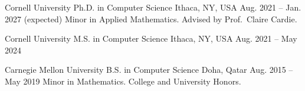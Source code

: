 
\begin{cventries}\acvinlinetrue %
  \cventry
    {Cornell University}
    {Ph.D. in Computer Science}
    {Ithaca, NY, USA}
    {Aug. 2021 -- Jan. 2027 (expected)}
    {Minor in Applied Mathematics. Advised by Prof.\ Claire Cardie.}

  \cventry
    {Cornell University}
    {M.S. in Computer Science}
    {Ithaca, NY, USA}
    {Aug. 2021 -- May 2024}
    {}

  \cventry
    {Carnegie Mellon University}
    {B.S. in Computer Science}
    {Doha, Qatar}
    {Aug. 2015 -- May 2019}
    {Minor in Mathematics. College and University Honors.}
\end{cventries}
